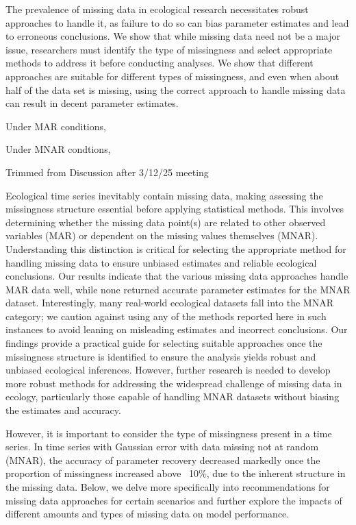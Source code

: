 The prevalence of missing data in ecological research necessitates robust approaches to handle it, as failure to do so can bias parameter estimates and lead to erroneous conclusions. We show that while missing data need not be a major issue, researchers must identify the type of missingness and select appropriate methods to address it before conducting analyses. We show that different approaches are suitable for different types of missingness, and even when about half of the data set is missing, using the correct approach to handle missing data can result in decent parameter estimates. 


Under MAR conditions, 

Under MNAR condtions, 



Trimmed from Discussion after 3/12/25 meeting




 
    Ecological time series inevitably contain missing data, making assessing the missingness structure essential before applying statistical methods. This involves determining whether the missing data point(s) are related to other observed variables (MAR) or dependent on the missing values themselves (MNAR). Understanding this distinction is critical for selecting the appropriate method for handling missing data to ensure unbiased estimates and reliable ecological conclusions. Our results indicate that the various missing data approaches handle MAR data well, while none returned accurate parameter estimates for the MNAR dataset. Interestingly, many real-world ecological datasets fall into the MNAR category; we caution against using any of the methods reported here in such instances to avoid leaning on misleading estimates and incorrect conclusions. Our findings provide a practical guide for selecting suitable approaches once the missingness structure is identified to ensure the analysis yields robust and unbiased ecological inferences. However, further research is needed to develop more robust methods for addressing the widespread challenge of missing data in ecology, particularly those capable of handling MNAR datasets without biasing the estimates and accuracy.
    
 However, it is important to consider the type of missingness present in a time series. In time series with Gaussian error with data missing not at random (MNAR), the accuracy of parameter recovery decreased markedly once the proportion of missingness increased above ~10\%, due to the inherent structure in the missing data. Below, we delve more specifically into recommendations for missing data approaches for certain scenarios and further explore the impacts of different amounts and types of missing data on model performance.

